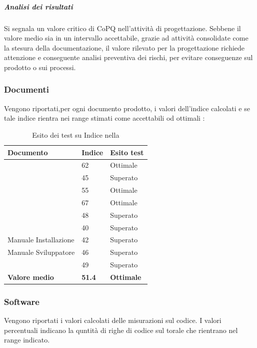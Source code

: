 \documentclass[12pt,a4paper]{article}
\begin{document}
	\subparagraph{Analisi dei risultati}
	Si segnala un valore critico di CoPQ nell'attività di progettazione. Sebbene il valore medio sia in un intervallo accettabile, grazie ad  attività consolidate come la stesura della documentazione, il valore rilevato per la progettazione richiede attenzione e conseguente analisi preventiva dei rischi, per evitare conseguenze sul prodotto o sui processi.

	
	\subsubsection{Documenti}
	Vengono riportati,per ogni documento prodotto, i valori dell'indice  calcolati e se  tale indice rientra nei range stimati come accettabili od ottimali :
	
	\begin{table}[H]
		\begin{center}
			\begin{tabular}{p{} p{0.3\textwidth} p{}}
				\toprule
				\textbf{Documento}   & \textbf{Indice \mgls{gulpease}}	& \textbf{Esito test} \\ \midrule
				\midrule
				\AdR & 62 & Ottimale  \\ \midrule    
				\NdP & 45 & Superato  \\ \midrule
				\PdP & 55 & Ottimale  \\ \midrule
				\PdQ & 67 &  Ottimale\\ \midrule
				\DP & 48 &  Superato \\ \midrule
				\MU & 40  & Superato \\ \midrule
				Manuale Installazione &  42 &  Superato \\ \midrule
				Manuale Sviluppatore  &  46 & Superato  \\ \midrule
				\GL & 49  & Superato \\ \midrule \midrule
				
				\textbf{Valore medio} & \textbf{51.4}& \textbf{Ottimale}\\ 
				\midrule
			\end{tabular}
		\end{center}
		\caption{Esito dei test su Indice  nella \FC}
	\end{table}
	
	\subsubsection{Software}
	Vengono riportati i valori calcolati delle misurazioni sul codice.
	I valori percentuali indicano la quntità di righe di codice sul torale che rientrano nel range indicato.
		
\end{document}
